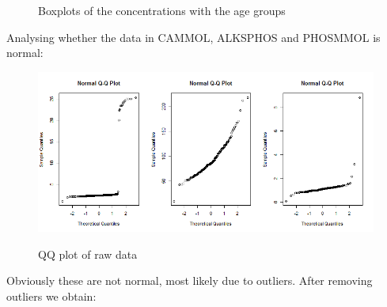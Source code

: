 \documentclass{article}
\begin{document}
\begin{figure}[H]
          \caption{Boxplots of the concentrations with the age groups}
          \label{fig:BoxAgegrp}
      \end{figure}

	Analysing whether the data in CAMMOL, ALKSPHOS and PHOSMMOL is normal:
	
	\begin{figure}[H]
		\centering
		{\includegraphics[scale=0.4]{../results/dat1_qq.png}}
		\caption{QQ plot of raw data}
		\label{fig:qq1}
	\end{figure}
	
	Obviously these are not normal, most likely due to outliers. After removing outliers we obtain:
	
\end{document}
